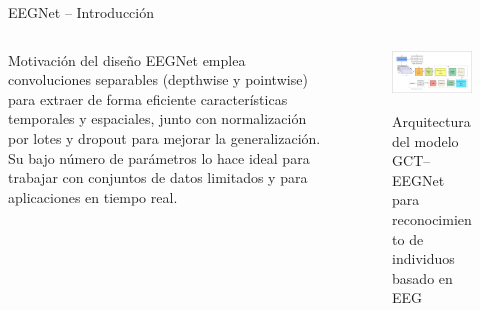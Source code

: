 \documentclass{beamer}
\begin{document}
\begin{frame}{EEGNet – Introducción}
\begin{columns}[T] %
    \begin{column}{0.45\textwidth}
\begin{block}{Motivación del diseño}
EEGNet emplea convoluciones separables (depthwise y pointwise) para extraer de forma eficiente características temporales y espaciales, junto con normalización por lotes y dropout para mejorar la generalización. Su bajo número de parámetros lo hace ideal para trabajar con conjuntos de datos limitados y para aplicaciones en tiempo real.
        \end{block}
    \end{column}

    \begin{column}{0.55\textwidth}
        \begin{figure}
            \centering
            \href{https://www.mdpi.com/2227-7390/12/20/3286}{%
            \includegraphics[width=\linewidth]{lightweight.png}%
            }
            \caption{\small Arquitectura del modelo GCT–EEGNet para reconocimiento de individuos basado en EEG}
            \label{fig:flujo_eeg}
        \end{figure}
    \end{column}
\end{columns}
\end{frame}
\end{document}

